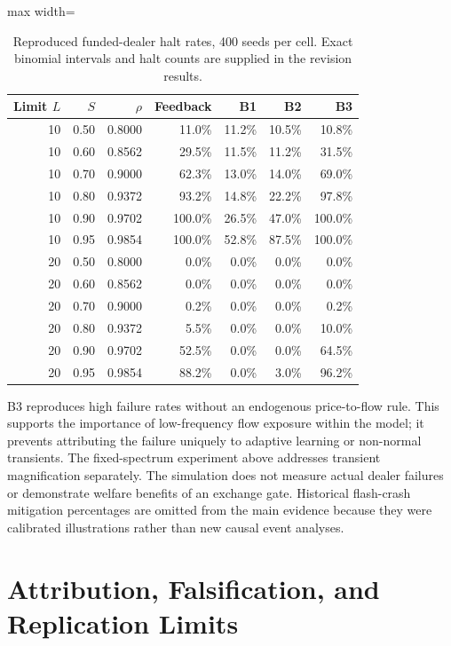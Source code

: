 \documentclass[12pt]{article}
\theoremstyle{definition}
\theoremstyle{remark}
\begin{document}
\begin{table}[htbp]
\centering\small
\caption{Reproduced funded-dealer halt rates, 400 seeds per cell. Exact binomial intervals and halt counts are supplied in the revision results.}
\label{tab:dealer_revised}
\begin{adjustbox}{max width=\textwidth}
\begin{tabular}{rrrrrrr}\toprule
Limit $L$ & $S$ & $\rho$ & Feedback & B1 & B2 & B3 \\\midrule
10 & 0.50 & 0.8000 & 11.0\% & 11.2\% & 10.5\% & 10.8\% \\
10 & 0.60 & 0.8562 & 29.5\% & 11.5\% & 11.2\% & 31.5\% \\
10 & 0.70 & 0.9000 & 62.3\% & 13.0\% & 14.0\% & 69.0\% \\
10 & 0.80 & 0.9372 & 93.2\% & 14.8\% & 22.2\% & 97.8\% \\
10 & 0.90 & 0.9702 & 100.0\% & 26.5\% & 47.0\% & 100.0\% \\
10 & 0.95 & 0.9854 & 100.0\% & 52.8\% & 87.5\% & 100.0\% \\
20 & 0.50 & 0.8000 & 0.0\% & 0.0\% & 0.0\% & 0.0\% \\
20 & 0.60 & 0.8562 & 0.0\% & 0.0\% & 0.0\% & 0.0\% \\
20 & 0.70 & 0.9000 & 0.2\% & 0.0\% & 0.0\% & 0.2\% \\
20 & 0.80 & 0.9372 & 5.5\% & 0.0\% & 0.0\% & 10.0\% \\
20 & 0.90 & 0.9702 & 52.5\% & 0.0\% & 0.0\% & 64.5\% \\
20 & 0.95 & 0.9854 & 88.2\% & 0.0\% & 3.0\% & 96.2\% \\
\bottomrule\end{tabular}
\end{adjustbox}
\end{table}

B3 reproduces high failure rates without an endogenous price-to-flow rule. This supports the importance of low-frequency flow exposure within the model; it prevents attributing the failure uniquely to adaptive learning or non-normal transients. The fixed-spectrum experiment above addresses transient magnification separately. The simulation does not measure actual dealer failures or demonstrate welfare benefits of an exchange gate. Historical flash-crash mitigation percentages are omitted from the main evidence because they were calibrated illustrations rather than new causal event analyses.

\section{Attribution, Falsification, and Replication Limits}
\label{sec:attribution_falsification}
\end{document}
